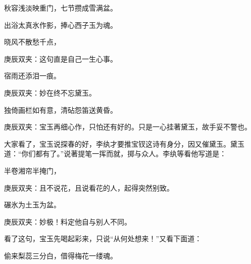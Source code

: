\begin{poem}
    \begin{pl}秋容浅淡映重门，七节攒成雪满盆。\end{pl}

    \begin{pl}出浴太真氷作影，捧心西子玉为魂。\end{pl}

    \begin{pl}晓风不散愁千点，\end{pl}
    \begin{note}庚辰双夹：这句直是自己一生心事。\end{note}
    \begin{pl}宿雨还添泪一痕。\end{pl}
    \begin{note}庚辰双夹：妙在终不忘黛玉。\end{note}

    \begin{pl}独倚画栏如有意，清砧怨笛送黄昏。\end{pl}
    \begin{note}庚辰双夹：宝玉再细心作，只怕还有好的。只是一心挂著黛玉，故手妥不警也。\end{note}
\end{poem}


\begin{parag}
    大家看了，宝玉说探春的好，李纨才要推宝钗这诗有身分，因又催黛玉。黛玉道：“你们都有了。”说著提笔一挥而就，掷与众人。李纨等看他写道是：
\end{parag}


\begin{poem}
    \begin{pl}半卷湘帘半掩门，\end{pl}\begin{note}庚辰双夹：且不说花，且说看花的人，起得突然别致。\end{note}

    \begin{pl}碾氷为土玉为盆。\end{pl}\begin{note}庚辰双夹：妙极！料定他自与别人不同。\end{note}
\end{poem}


\begin{parag}
    看了这句，宝玉先喝起彩来，只说“从何处想来！”又看下面道：
\end{parag}


\begin{poem}
    \begin{pl}偷来梨蕊三分白，借得梅花一缕魂。\end{pl}
\end{poem}


